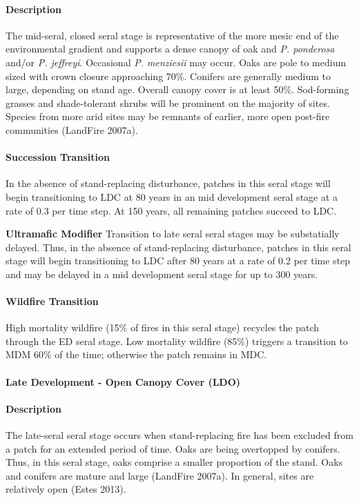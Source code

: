 \paragraph{Description} The mid-seral, closed seral stage is representative of the more mesic end of the environmental gradient and supports a dense canopy of oak and \emph{P. ponderosa} and/or \emph{P. jeffreyi}. Occasional \emph{P. menziesii} may occur. Oaks are pole to medium sized with crown closure approaching 70\%. Conifers are generally medium to large, depending on stand age. Overall canopy cover is at least 50\%. Sod-forming grasses and shade-tolerant shrubs will be prominent on the majority of sites. Species from more arid sites may be remnants of earlier, more open post-fire communities (LandFire 2007a).

\paragraph{Succession Transition} In the absence of stand-replacing disturbance, patches in this seral stage will begin transitioning to LDC at 80 years in an mid development seral stage at a rate of 0.3 per time step. At 150 years, all remaining patches succeed to LDC.
\begin{adjustwidth}{2cm}{}

\medskip
\textbf{Ultramafic Modifier}  Transition to late seral seral stages may be substatially delayed. Thus, in the absence of stand-replacing disturbance, patches in this seral stage will begin transitioning to LDC after 80 years at a rate of 0.2 per time step and may be delayed in a mid development seral stage for up to 300 years.

\end{adjustwidth}
\paragraph{Wildfire Transition} High mortality wildfire (15\% of fires in this seral stage) recycles the patch through the ED seral stage. Low mortality wildfire (85\%) triggers a transition to MDM 60\% of the time; otherwise the patch remains in MDC.


\noindent\hrulefill


\paragraph{Late Development - Open Canopy Cover (LDO)}

\paragraph{Description} The late-seral seral stage occurs when stand-replacing fire has been excluded from a patch for an extended period of time. Oaks are being overtopped by conifers. Thus, in this seral stage, oaks comprise a smaller proportion of the stand. Oaks and conifers are mature and large (LandFire 2007a). In general, sites are relatively open (Estes 2013).

